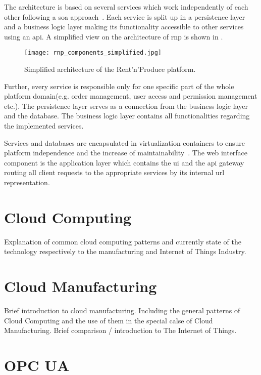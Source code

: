 \documentclass[
a4paper,
twoside,
headsepline,
cleardoublepage=empty,
parskip=half,
draft=false
]{scrbook}
\begin{document}
			The architecture is based on several services which work independently of each other following a \gls{soa} approach~\cite{erl2008soa}. 
			Each service is split up in a persistence layer and a business logic layer making its functionality accessible to other services using an \gls{api}.
			A simplified view on the architecture of \gls{rnp} is shown in .
			
			\begin{figure}[htbp]
				\centering
				\texttt{[image: rnp\_components\_simplified.jpg]}
				\caption{Simplified architecture of the Rent'n'Produce platform.}
				\label{fig:rnp_architecture}
			\end{figure}
			
			Further, every service is responsible only for one specific part of the whole platform domain(e.g. order management, user access and permission management etc.). 
			The persistence layer serves as a connection from the business logic layer and the database. 
			The business logic layer contains all functionalities regarding the implemented services. 
			
			Services and databases are encapsulated in virtualization containers to ensure platform independence and the increase of maintainability~\cite{xen.17b}. 
			The web interface component is the application layer which contains the \gls{ui} and the \gls{api} gateway routing all client requests to the appropriate services by its internal \gls{url} representation. 
			
		\section{Cloud Computing}\label{sec:cloud_computing}
		
			Explanation of common cloud computing patterns and currently state of the technology respectively to the manufacturing and Internet of Things Industry.~\cite{mell2011nist}
		
		\section{Cloud Manufacturing}\label{sec:cloud_manufacturing}
		
			Brief introduction to cloud manufacturing. Including the general patterns of Cloud Computing and the use of them in the special calse of Cloud Manufacturing. Brief comparison / introduction to The Internet of Things.
		
		\section{OPC UA} \label{sec:opc_ua}
		
\end{document}
